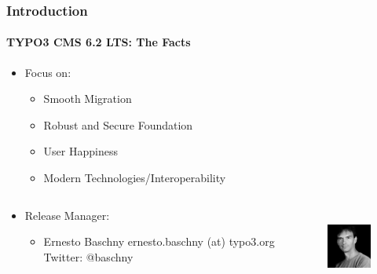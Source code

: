 \begin{frame}[fragile]
	\frametitle{Introduction}
	\framesubtitle{TYPO3 CMS 6.2 LTS: The Facts}

	\begin{itemize}
		\item Focus on:
			\begin{itemize}
				\item Smooth Migration
				\item Robust and Secure Foundation
				\item User Happiness
				\item Modern Technologies/Interoperability
			\end{itemize}
	\end{itemize}

	\begin{columns}[T]
		\begin{column}{.5\textwidth}
			\begin{itemize}
				\item Release Manager:
				\begin{itemize}
					\item Ernesto Baschny\newline
						ernesto.baschny (at) typo3.org\newline
						Twitter: @baschny
				\end{itemize}
			\end{itemize}
		\end{column}

		\begin{column}{.5\textwidth}
			\begin{figure}
				\includegraphics[width=2.6cm,height=2.6cm]{Images/Introduction/ErnestoBaschny.jpg}
			\end{figure}
		\end{column}

	\end{columns}

\end{frame}


